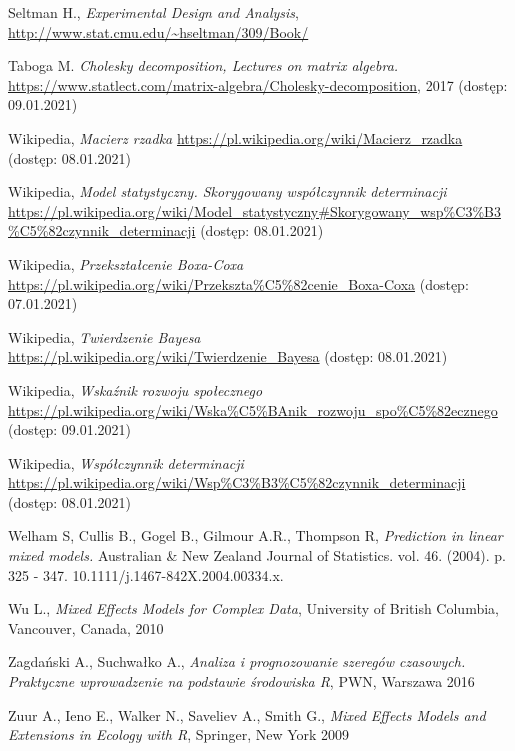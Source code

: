 \documentclass[12pt]{mwbk}
\theoremstyle{plain}
\theoremstyle{definition}
\theoremstyle{definition}
\begin{document}
\begin{thebibliography}{99}
 Seltman H., \emph{Experimental Design and Analysis}, \url{http://www.stat.cmu.edu/~hseltman/309/Book/}

 Taboga M. \emph{Cholesky decomposition, Lectures on matrix algebra.} \url{https://www.statlect.com/matrix-algebra/Cholesky-decomposition}, 2017 (dostęp: 09.01.2021)

 Wikipedia, \emph{Macierz rzadka} \url{https://pl.wikipedia.org/wiki/Macierz_rzadka} (dostęp: 08.01.2021)

 Wikipedia, \emph{Model statystyczny. Skorygowany współczynnik determinacji} \url{https://pl.wikipedia.org/wiki/Model\_statystyczny#Skorygowany\_wsp\%C3\%B3\%C5\%82czynnik\_determinacji} (dostęp: 08.01.2021)

 Wikipedia, \emph{Przekształcenie Boxa-Coxa} \url{https://pl.wikipedia.org/wiki/Przekszta\%C5\%82cenie\_Boxa-Coxa} (dostęp: 07.01.2021)

 Wikipedia, \emph{Twierdzenie Bayesa} \url{https://pl.wikipedia.org/wiki/Twierdzenie_Bayesa} (dostęp: 08.01.2021)

 Wikipedia, \emph{Wskaźnik rozwoju społecznego} \url{https://pl.wikipedia.org/wiki/Wska\%C5\%BAnik\_rozwoju\_spo\%C5\%82ecznego} (dostęp: 09.01.2021)

 Wikipedia, \emph{Współczynnik determinacji} \url{https://pl.wikipedia.org/wiki/Wsp\%C3\%B3\%C5\%82czynnik\_determinacji} (dostęp: 08.01.2021)

 Welham S, Cullis B., Gogel B.,  Gilmour A.R.,  Thompson R, \emph{Prediction in linear mixed models.} Australian \& New Zealand Journal of Statistics. vol. 46.  (2004). p.  325 - 347. 10.1111/j.1467-842X.2004.00334.x. 

 Wu L., \emph{Mixed Effects Models for Complex Data}, University of British Columbia, Vancouver, Canada, 2010

 Zagdański A., Suchwałko A., \emph{Analiza i prognozowanie szeregów czasowych. Praktyczne wprowadzenie na podstawie środowiska R}, PWN, Warszawa 2016

 Zuur A., Ieno E., Walker N.,
Saveliev A., Smith G., \emph{Mixed Effects Models and Extensions in Ecology with R}, Springer, New York 2009



\end{thebibliography}
\end{document}
